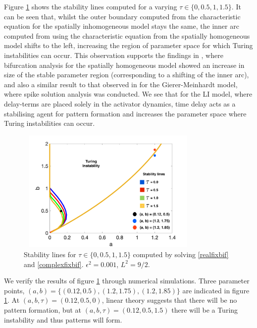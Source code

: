 Figure \ref{fig:tspacetau} shows the stability lines computed for a varying $\tau\in\{0,0.5,1,1.5\}$. It can be seen that, whilst the outer boundary computed from the characteristic equation for the spatially inhomogeneous model stays the same, the inner arc computed from using the characteristic equation from the spatially homogeneous model shifts to the left, increasing the region of parameter space for which Turing instabilities can occur. This observation supports the findings in \cite{william}, where bifurcation analysis for the spatially homogeneous model showed an increase in size of the stable parameter region (corresponding to a shifting of the inner arc), and also a similar result to that observed in \cite{fadai2} for the Gierer-Meinhardt model, where spike solution analysis was conducted. We see that for the LI model, where delay-terms are placed solely in the activator dynamics, time delay acts as a stabilising agent for pattern formation and increases the parameter space where Turing instabilities can occur.
\begin{figure}[H]
        \centering
        \includegraphics[width=9cm,height = 6cm]{tspacetau.png}
        \caption{Stability lines for $\tau\in\{0,0.5,1,1.5\}$ computed by solving \eqref{realfixbif} and \eqref{complexfixbif}. $\epsilon^2=0.001$, $L^2=9/2$.}
        \label{fig:tspacetau}
\end{figure}
We verify the results of figure \ref{fig:tspacetau} through numerical simulations. Three parameter points, $(a,b)=\{(0.12,0.5),(1.2,1.75),(1.2,1.85)\}$ are indicated in figure \ref{fig:tspacetau}. At $(a,b,\tau)=(0.12,0.5,0)$, linear theory suggests that there will be no pattern formation, but at $(a,b,\tau)=(0.12,0.5,1.5)$ there will be a Turing instability and thus patterns will form.
